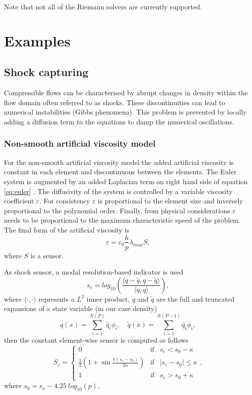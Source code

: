 Note that not all of the Riemann solvers are currently supported. 


\section{Examples}
\subsection{Shock capturing}
Compressible flows can be characterised by abrupt changes in density within the flow domain often referred to as shocks. These discontinuities can lead to numerical instabilities (Gibbs phenomena). This problem is prevented by locally adding a diffusion term to the equations to damp the numerical oscillations.

\subsubsection{Non-smooth artificial viscosity model}
For the non-smooth artificial viscosity model the added artificial viscosity is constant in each element and discontinuous between the elements. The Euler system is augmented by an added Laplacian term on right hand side of equation \ref{eq:euler} \cite{persson2006sub}.
The diffusivity of the system is controlled by a variable viscosity coefficient $\varepsilon$.
For consistency $\varepsilon$ is proportional to the element size and inversely proportional to the polynomial order.
Finally, from physical considerations $\varepsilon$ needs to be proportional to the maximum characteristic speed of the problem.
The final form of the artificial viscosity is
\begin{equation}
  \varepsilon = \varepsilon_0 \frac{h}{p} \lambda_{max} S,
\end{equation}
where $S$ is a sensor.

As shock sensor, a modal resolution-based indicator is used
\begin{equation}\label{eq:sensor}
  s_e = log_{10}\left( \frac{\langle q - \tilde{q}, q - \tilde{q}  \rangle}{\langle q, q \rangle} \right) ,
\end{equation}
where $\langle \cdot, \cdot \rangle$ represents a $L^2$ inner product, $q$ and $\tilde{q}$ are the full and truncated expansions of a state variable (in our case density)
\begin{equation}
  q(x) = \sum_{i=1}^{N(P)} \hat{q}_i \phi_i , \quad \tilde{q}(x) = \sum_{i=1}^{N(P-1)} \hat{q}_i \phi_i ,
\end{equation}
then the constant element-wise sensor is computed as follows
\begin{equation}
   S_\varepsilon
=  \left \{ \begin{array}{lll}
    0 &	 \mbox{if} & s_e<s_0-\kappa \\
    \frac{1}{2}\left(1+\sin{\frac{\pi\left(s_e-s_0\right)}{2\kappa}}\right) &	\mbox{if} &	| s_e - s_0| \le \kappa\\
    1 &	 \mbox{if} & s_e > s_0+\kappa
      \end{array}
    \right.,
\end{equation}
where $s_0 = s_\kappa - 4.25\;log_{10}(p)$.

